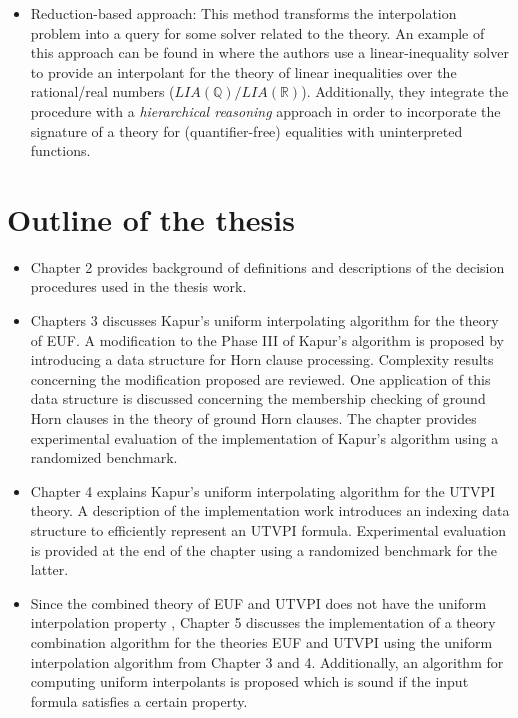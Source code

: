 \begin{itemize}
  \item Reduction-based approach: This method transforms the interpolation
    problem into a query for some solver related to the theory. 
    An example of this approach can be found in \cite{10.1007/978-3-540-69738-1_25}
    where the authors use a linear-inequality solver to provide an interpolant
    for the theory of linear inequalities over the rational/real numbers 
    ($LIA(\mathbb{Q})/LIA(\mathbb{R})$). 
    Additionally, they integrate the procedure with a 
    \emph{hierarchical reasoning} approach in order to incorporate 
    the signature of a theory for (quantifier-free) equalities with uninterpreted 
    functions.
\end{itemize}

\section{Outline of the thesis}

\begin{itemize}
  \item Chapter 2 provides background 
    of definitions and descriptions of the
    decision procedures 
    used in the thesis work.
  \item Chapters 3 discusses Kapur's uniform 
    interpolating algorithm for the theory of EUF.
    A modification to the Phase III of 
    Kapur's algorithm is proposed by introducing a 
    data structure for Horn clause processing. 
    Complexity results concerning the modification 
    proposed are reviewed. 
    One application of this data structure
    is discussed concerning the membership 
    checking of ground 
    Horn clauses in the theory of ground Horn clauses.
    The chapter provides experimental evaluation
    of the implementation of Kapur's algorithm 
    using a randomized benchmark.
  \item Chapter 4 explains Kapur's uniform interpolating
    algorithm for the UTVPI theory. A description 
    of the implementation work introduces an indexing
    data structure to efficiently represent an UTVPI
    formula. Experimental evaluation is provided at 
    the end of the chapter using a randomized 
    benchmark for the latter. 
  \item Since the combined theory of EUF and UTVPI
    does not have the uniform interpolation property 
    \cite{10.1007/978-3-030-51074-9_11},
    Chapter 5 discusses the implementation of
    a theory combination algorithm for the theories
    EUF and UTVPI using the uniform 
    interpolation algorithm from Chapter 3 and 4. 
    Additionally, an algorithm for computing 
    uniform interpolants
    is proposed which is sound if the input 
    formula satisfies a certain property.

\end{itemize} 

